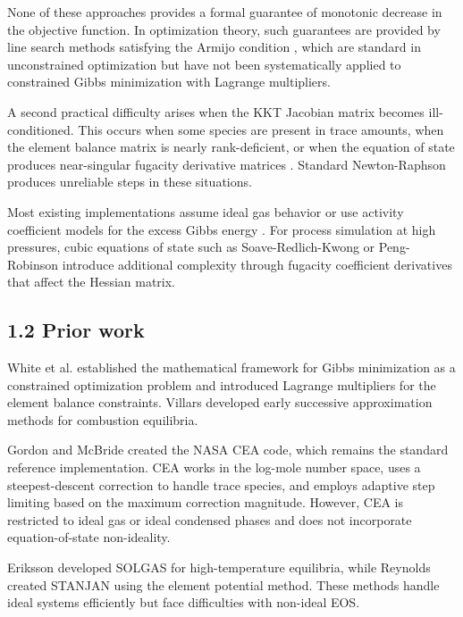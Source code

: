 \documentclass[review,3p]{elsarticle}
\begin{document}
None of these approaches provides a formal guarantee of monotonic decrease in the objective function. In optimization theory, such guarantees are provided by line search methods satisfying the Armijo condition \citep{NocedalWright2006, Armijo1966}, which are standard in unconstrained optimization but have not been systematically applied to constrained Gibbs minimization with Lagrange multipliers.

A second practical difficulty arises when the KKT Jacobian matrix becomes ill-conditioned. This occurs when some species are present in trace amounts, when the element balance matrix is nearly rank-deficient, or when the equation of state produces near-singular fugacity derivative matrices \citep{Leal2016}. Standard Newton-Raphson produces unreliable steps in these situations.

Most existing implementations assume ideal gas behavior or use activity coefficient models for the excess Gibbs energy \citep{SmithMissen1982, GordonMcBride1994}. For process simulation at high pressures, cubic equations of state such as Soave-Redlich-Kwong \citep{SoaveRedlichKwong1972} or Peng-Robinson \citep{PengRobinson1976} introduce additional complexity through fugacity coefficient derivatives that affect the Hessian matrix.

\subsection{1.2 Prior work}

White et al. \citep{White1958} established the mathematical framework for Gibbs minimization as a constrained optimization problem and introduced Lagrange multipliers for the element balance constraints. Villars \citep{Villars1959} developed early successive approximation methods for combustion equilibria.

Gordon and McBride \citep{GordonMcBride1994} created the NASA CEA code, which remains the standard reference implementation. CEA works in the log-mole number space, uses a steepest-descent correction to handle trace species, and employs adaptive step limiting based on the maximum correction magnitude. However, CEA is restricted to ideal gas or ideal condensed phases and does not incorporate equation-of-state non-ideality.

Eriksson \citep{Eriksson1971} developed SOLGAS for high-temperature equilibria, while Reynolds \citep{Reynolds1986} created STANJAN using the element potential method. These methods handle ideal systems efficiently but face difficulties with non-ideal EOS.
\end{document}
